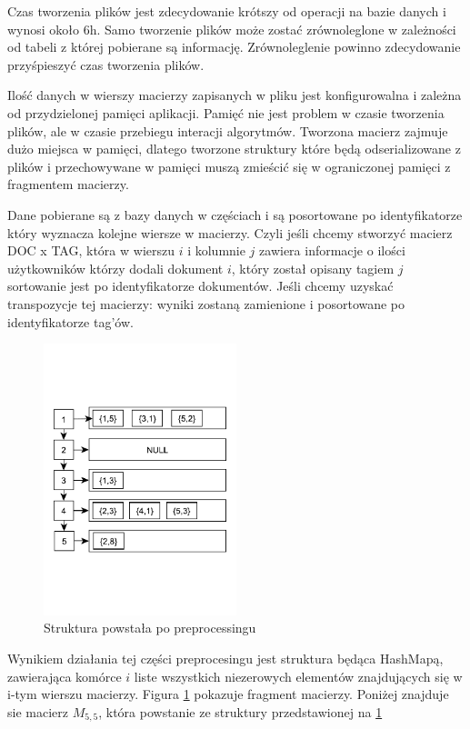 \documentclass[11pt,a4paper]{report}
\begin{document}
Czas tworzenia plików jest zdecydowanie krótszy od operacji na bazie danych i wynosi około 6h. Samo tworzenie plików może zostać zrównoleglone w zależności od tabeli z której pobierane są informację. Zrównoleglenie powinno zdecydowanie przyśpieszyć czas tworzenia plików. 

Ilość danych w wierszy macierzy zapisanych w pliku jest konfigurowalna i zależna od przydzielonej pamięci aplikacji. Pamięć nie jest problem w czasie tworzenia plików, ale w czasie przebiegu interacji algorytmów. Tworzona macierz zajmuje dużo miejsca w pamięci, dlatego tworzone struktury które będą odserializowane z plików i przechowywane w pamięci muszą zmieścić się w ograniczonej pamięci z fragmentem macierzy.


Dane pobierane są z bazy danych w częściach i są posortowane po identyfikatorze który wyznacza kolejne wiersze w macierzy. Czyli jeśli chcemy stworzyć macierz DOC x  TAG, która w wierszu $i$ i kolumnie $j$ zawiera informacje o ilości użytkowników którzy dodali dokument $i$, który został opisany tagiem $j$ sortowanie jest po identyfikatorze dokumentów. Jeśli chcemy uzyskać transpozycje tej macierzy: wyniki zostaną zamienione i posortowane po identyfikatorze tag'ów. 

\begin{figure}[htb]
\centering
\includegraphics[width=0.5\textwidth, trim = 0mm 33mm 0mm 33mm, clip]{file_processing.pdf}
\caption{Struktura powstała po preprocessingu}
\label{fig:preprocessing_fig}
\end{figure}

Wynikiem działania tej części preprocesingu jest struktura będąca HashMapą, zawierająca komórce $i$ liste wszystkich niezerowych elementów znajdujących się w i-tym wierszu macierzy. Figura \ref{fig:preprocessing_fig} pokazuje fragment macierzy. Poniżej znajduje sie macierz $M_{5,5}$, która powstanie ze struktury przedstawionej na \ref{fig:preprocessing_fig}
\end{document}
